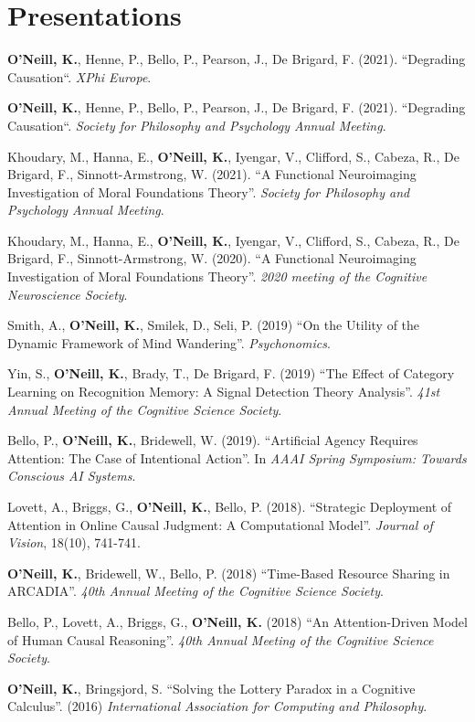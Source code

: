 \section{Presentations}
\textbf{O'Neill, K.}, Henne, P., Bello, P., Pearson, J., De Brigard,
F. (2021). ``Degrading Causation``. \emph{XPhi Europe}.

\textbf{O'Neill, K.}, Henne, P., Bello, P., Pearson, J., De Brigard,
F. (2021). ``Degrading Causation``. \emph{Society for Philosophy and
Psychology Annual Meeting}.

Khoudary, M., Hanna, E., \textbf{O’Neill, K.}, Iyengar, V., Clifford,
S., Cabeza, R., De Brigard, F., Sinnott-Armstrong, W. (2021). ``A
Functional Neuroimaging Investigation of Moral Foundations
Theory''. \emph{Society for Philosophy and Psychology Annual Meeting}.

Khoudary, M., Hanna, E., \textbf{O’Neill, K.}, Iyengar, V., Clifford,
S., Cabeza, R., De Brigard, F., Sinnott-Armstrong, W. (2020). ``A
Functional Neuroimaging Investigation of Moral Foundations
Theory''. \emph{2020 meeting of the Cognitive Neuroscience Society}.

Smith, A., \textbf{O'Neill, K.}, Smilek, D., Seli, P. (2019) ``On the
Utility of the Dynamic Framework of Mind
Wandering''. \emph{Psychonomics}.

Yin, S., \textbf{O'Neill, K.}, Brady, T., De Brigard, F. (2019) ``The
Effect of Category Learning on Recognition Memory: A Signal Detection
Theory Analysis''. \emph{41st Annual Meeting of the Cognitive Science
Society}.

Bello, P., \textbf{O'Neill, K.}, Bridewell, W. (2019). ``Artificial
Agency Requires Attention: The Case of Intentional Action''. In
\emph{AAAI Spring Symposium: Towards Conscious AI Systems}.

Lovett, A., Briggs, G., \textbf{O'Neill, K.}, Bello,
P. (2018). ``Strategic Deployment of Attention in Online Causal
Judgment: A Computational Model''. \emph{Journal of Vision}, 18(10),
741-741.

\textbf{O'Neill, K.}, Bridewell, W., Bello, P. (2018) ``Time-Based
Resource Sharing in ARCADIA''. \emph{40th Annual Meeting of the
Cognitive Science Society}.

Bello, P., Lovett, A., Briggs, G., \textbf{O'Neill, K.} (2018) ``An
Attention-Driven Model of Human Causal Reasoning''. \emph{40th Annual
Meeting of the Cognitive Science Society}.
  
\textbf{O’Neill, K.}, Bringsjord, S. ``Solving the Lottery Paradox in
a Cognitive Calculus''. (2016) \emph{International Association for
Computing and Philosophy}.
